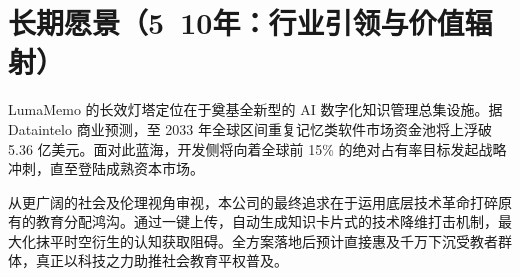 \section{长期愿景（5~10年：行业引领与价值辐射）}

LumaMemo 的长效灯塔定位在于奠基全新型的 AI 数字化知识管理总集设施。据 Dataintelo 商业预测，至 2033 年全球区间重复记忆类软件市场资金池将上浮破 5.36 亿美元。面对此蓝海，开发侧将向着全球前 15\% 的绝对占有率目标发起战略冲刺，直至登陆成熟资本市场。

从更广阔的社会及伦理视角审视，本公司的最终追求在于运用底层技术革命打碎原有的教育分配鸿沟。通过一键上传，自动生成知识卡片式的技术降维打击机制，最大化抹平时空衍生的认知获取阻碍。全方案落地后预计直接惠及千万下沉受教者群体，真正以科技之力助推社会教育平权普及。
